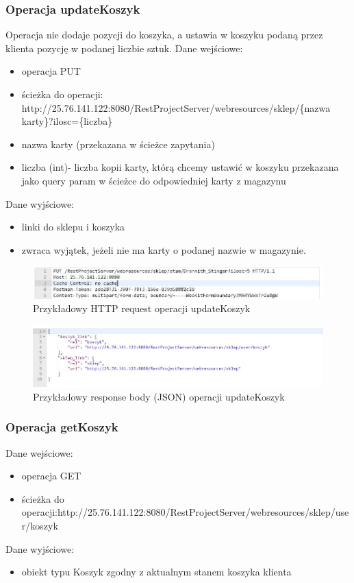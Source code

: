 \documentclass[11pt]{article}   %
\begin{document}
\subsubsection{Operacja updateKoszyk}
Operacja nie dodaje pozycji do koszyka, a ustawia w koszyku podaną przez klienta pozycję w podanej liczbie sztuk.\newline
Dane wejściowe:
\begin{itemize}
	\item operacja PUT
	\item ścieżka do operacji: \newline http://25.76.141.122:8080/RestProjectServer/webresources/sklep/\{nazwa karty\}?ilosc=\{liczba\}
	\item nazwa karty (przekazana w ścieżce zapytania)
\item liczba (int)- liczba kopii karty, którą chcemy ustawić w koszyku przekazana jako query param w ścieżce do odpowiedniej karty z magazynu
\end{itemize}	
Dane wyjściowe:
\begin{itemize}
	\item linki do sklepu i koszyka
	\item zwraca wyjątek, jeżeli nie ma karty o podanej nazwie w magazynie.
\end{itemize}
\begin{figure}[H]
	\centering
	\includegraphics[width=0.8\linewidth]{komunikaty_zdjecia_rest/updateKoszyk_req}
	\caption{Przykładowy HTTP request operacji updateKoszyk}
	\label{zrzut41}
\end{figure}
\begin{figure}[H]
	\centering
	\includegraphics[width=0.8\linewidth]{komunikaty_zdjecia_rest/updateKoszyk_res_body}
	\caption{Przykładowy response body (JSON) operacji updateKoszyk}
	\label{zrzut42}
\end{figure}
\subsubsection{Operacja getKoszyk}
Dane wejściowe:
\begin{itemize}
	\item operacja GET
	\item ścieżka do \newline operacji:http://25.76.141.122:8080/RestProjectServer/webresources/sklep/user/koszyk
\end{itemize}	
Dane wyjściowe:
\begin{itemize}
	\item obiekt typu Koszyk zgodny z aktualnym stanem koszyka klienta

	
\end{itemize}
\end{document}
